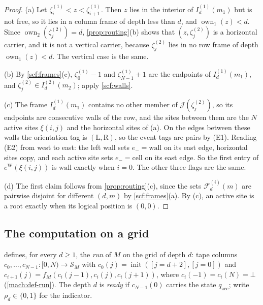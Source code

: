 \begin{proof}
(a) Let $\zeta^{(1)}_i<z<\zeta^{(1)}_{i+1}$. Then $z$ lies in the interior of $I^{(1)}_d(m_1)$ but is not free, so it lies in a column frame of depth less than $d$, and $\operatorname{own}_1(z)<d$. Since $\operatorname{own}_2(\zeta^{(2)}_j)=d$, \cref{prop:routing}(b) shows that $(z,\zeta^{(2)}_j)$ is a horizontal carrier, and it is not a vertical carrier, because $\zeta^{(2)}_j$ lies in no row frame of depth $\operatorname{own}_1(z)<d$. The vertical case is the same.

(b) By \cref{scf:frames}(c), $\zeta^{(1)}_0-1$ and $\zeta^{(1)}_{N-1}+1$ are the endpoints of $I^{(1)}_d(m_1)$, and $\zeta^{(2)}_j\in I^{(2)}_d(m_2)$; apply \cref{scf:walls}.

(c) The frame $I^{(1)}_d(m_1)$ contains no other member of $\mathcal J(\zeta^{(2)}_j)$, so its endpoints are consecutive walls of the row, and the sites between them are the $N$ active sites $\xi(i,j)$ and the horizontal sites of (a). On the edges between these walls the orientation tag is $(\mathrm L,\mathrm R)$, so the event tags are pairs by (E1). Reading (E2) from west to east: the left wall sets $e_-=\mathrm{wall}$ on its east edge, horizontal sites copy, and each active site sets $e_-=\mathrm{cell}$ on its east edge. So the first entry of $e^{\mathrm W}(\xi(i,j))$ is $\mathrm{wall}$ exactly when $i=0$. The other three flags are the same.

(d) The first claim follows from \cref{prop:routing}(c), since the sets $\mathcal F^{(i)}_d(m)$ are pairwise disjoint for different $(d,m)$ by \cref{scf:frames}(a). By (c), an active site is a root exactly when its logical position is $(0,0)$.
\end{proof}

\subsection{The computation on a grid}

 defines, for every $d\ge1$, the \emph{run} of $M$ on the grid of depth $d$: tape columns $c_0,\dots,c_{N-1}\colon[0,N)\to\mathcal S_M$ with $c_0(j)=\operatorname{init}([j=d+2],[j=0])$ and $c_{i+1}(j)=f_M(c_i(j-1),c_i(j),c_i(j+1))$, where $c_i(-1)=c_i(N)=\bot$ (\cref{mach:def-run}). The depth $d$ is \emph{ready} if $c_{N-1}(0)$ carries the state $q_{\mathrm{acc}}$; write $\rho_d\in\{0,1\}$ for the indicator.

